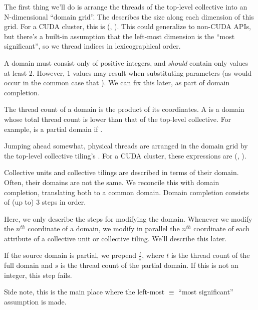 \filbreak
{}

The first thing we'll do is arrange the threads of the top-level collective into an N-dimensional ``domain grid''.
The  describes the size along each dimension of this grid.
For a CUDA cluster, this is (, ).
This could generalize to non-CUDA APIs, but there's a built-in assumption that the left-most dimension is the ``most significant'', so we  thread indices in lexicographical order.

A domain must consist only of positive integers, and \textit{should} contain only values at least 2.
However, 1 values may result when substituting parameters (as would occur in the common case that ).
We can fix this later, as part of domain completion.

\filbreak
The thread count of a domain is the product of its coordinates.
A  is a domain whose total thread count is lower than that of the top-level collective.
For example,  is a partial domain if .

\filbreak
Jumping ahead somewhat, physical threads are arranged in the domain grid by the top-level collective tiling's .
For a CUDA cluster, these expressions are (, ).

\filbreak
{}

Collective units and collective tilings are described in terms of their domain.
Often, their domains are not the same.
We reconcile this with domain completion, translating both to a common domain.
Domain completion consists of (up to) 3 steps in order.

\filbreak
Here, we only describe the steps for modifying the domain.
Whenever we modify the $n^{th}$ coordinate of a domain, we modify in parallel the $n^{th}$ coordinate of each attribute of a collective unit or collective tiling.
We'll describe this later.

\filbreak
{} If the source domain is partial, we prepend $\frac{t}{s}$, where $t$ is the thread count of the full domain and $s$ is the thread count of the partial domain.
If this is not an integer, this step fails.

Side note, this is the main place where the left-most $\equiv$ ``most significant'' assumption is made.

